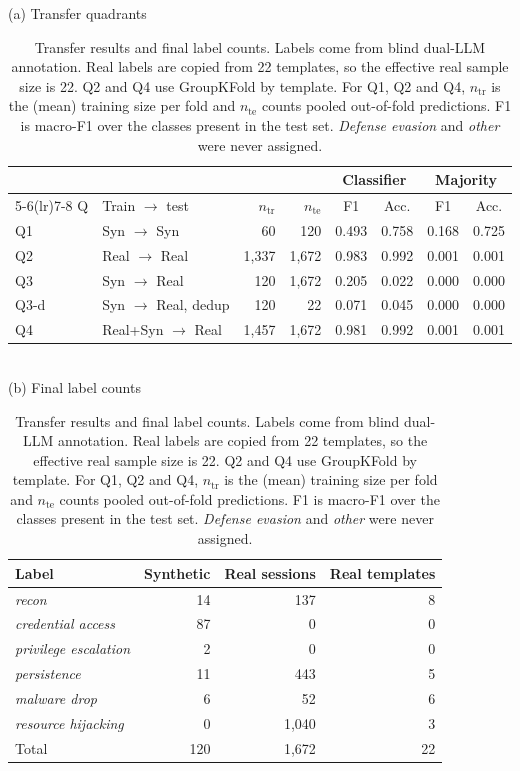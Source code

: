 \documentclass[conference]{IEEEtran}
\newcommand{\lbl}[1]{\textit{#1}}
\begin{document}
\begin{table}[t]
\caption{Transfer results and final label counts. Labels come from blind dual-LLM annotation. Real labels are copied from 22 templates, so the effective real sample size is 22. Q2 and Q4 use GroupKFold by template. For Q1, Q2 and Q4, $n_{\mathrm{tr}}$ is the (mean) training size per fold and $n_{\mathrm{te}}$ counts pooled out-of-fold predictions. F1 is macro-F1 over the classes present in the test set. \lbl{Defense evasion} and \lbl{other} were never assigned.}
\label{tab:transfer}
\centering
\footnotesize
\setlength{\tabcolsep}{3pt}
(a) Transfer quadrants\\[3pt]
\begin{tabular}{@{}llrrcccc@{}}
\toprule
 & & & & \multicolumn{2}{c}{Classifier} & \multicolumn{2}{c}{Majority} \\
\cmidrule(lr){5-6}\cmidrule(lr){7-8}
Q & Train $\to$ test & $n_{\mathrm{tr}}$ & $n_{\mathrm{te}}$ & F1 & Acc. & F1 & Acc. \\
\midrule
Q1   & Syn $\to$ Syn          & 60    & 120   & 0.493 & 0.758 & 0.168 & 0.725 \\
Q2   & Real $\to$ Real        & 1,337 & 1,672 & 0.983 & 0.992 & 0.001 & 0.001 \\
Q3   & Syn $\to$ Real         & 120   & 1,672 & 0.205 & 0.022 & 0.000 & 0.000 \\
Q3-d & Syn $\to$ Real, dedup  & 120   & 22    & 0.071 & 0.045 & 0.000 & 0.000 \\
Q4   & Real+Syn $\to$ Real    & 1,457 & 1,672 & 0.981 & 0.992 & 0.001 & 0.001 \\
\bottomrule
\end{tabular}\\[8pt]
(b) Final label counts\\[3pt]
\begin{tabular}{@{}lrrr@{}}
\toprule
Label & Synthetic & Real sessions & Real templates \\
\midrule
\lbl{recon}                & 14  & 137   & 8 \\
\lbl{credential access}    & 87  & 0     & 0  \\
\lbl{privilege escalation} & 2   & 0     & 0  \\
\lbl{persistence}          & 11  & 443   & 5  \\
\lbl{malware drop}         & 6   & 52    & 6  \\
\lbl{resource hijacking}   & 0   & 1,040 & 3  \\
\midrule
Total                      & 120 & 1,672 & 22 \\
\bottomrule
\end{tabular}
\end{table}
\end{document}
